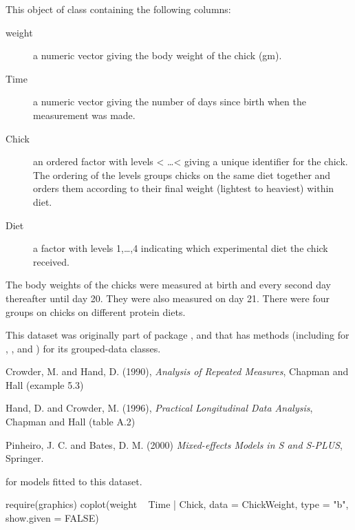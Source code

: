 \begin{Format}
This object of class  containing the following columns:
\begin{description}

\item[weight] 
a numeric vector giving the body weight of the chick (gm).

\item[Time] 
a numeric vector giving the number of days since birth when
the measurement was made.

\item[Chick] 
an ordered factor with levels
 < \dots < 
giving a unique identifier for the chick.  The ordering of
the levels groups chicks on the same diet together and
orders them according to their final weight (lightest to
heaviest) within diet.

\item[Diet] 
a factor with levels 1,\dots,4 indicating which
experimental diet the chick received.


\end{description}

\end{Format}
%
\begin{Details}\relax
The body weights of the chicks were measured at birth and every
second day thereafter until day 20.  They were also measured on day
21.  There were four groups on chicks on different protein diets.

This dataset was originally part of package , and that has
methods (including for \code{[}, ,  and
) for its grouped-data classes. 
\end{Details}
%
\begin{Source}\relax
Crowder, M. and Hand, D. (1990), \emph{Analysis of Repeated Measures},
Chapman and Hall (example 5.3)

Hand, D. and Crowder, M. (1996), \emph{Practical Longitudinal Data
Analysis}, Chapman and Hall (table A.2)

Pinheiro, J. C. and Bates, D. M. (2000) \emph{Mixed-effects Models in
S and S-PLUS}, Springer.
\end{Source}
%
\begin{SeeAlso}\relax
{} for models fitted to this dataset.
\end{SeeAlso}
%
\begin{Examples}
\begin{ExampleCode}

require(graphics)
coplot(weight ~ Time | Chick, data = ChickWeight,
       type = "b", show.given = FALSE)
\end{ExampleCode}
\end{Examples}
